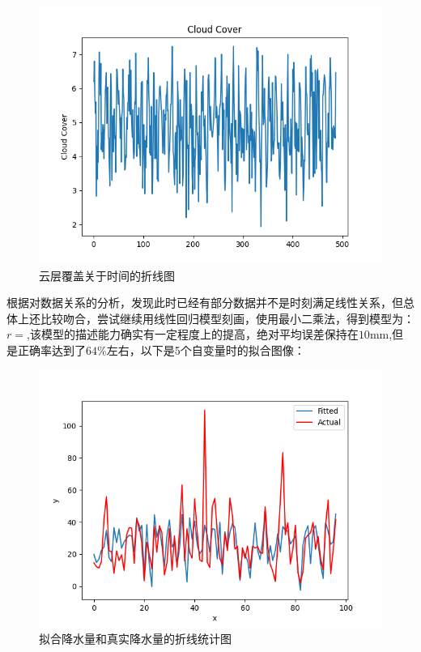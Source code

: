 \documentclass[UTF8, a4paper]{ctexart}
\begin{document}
\clearpage

\begin{figure}[h!]
	\centering
	\includegraphics[scale=0.5]{cc.png}
	\caption{云层覆盖关于时间的折线图}
\end{figure}

根据对数据关系的分析，发现此时已经有部分数据并不是时刻满足线性关系，但总体上还比较吻合，尝试继续用线性回归模型刻画，使用最小二乘法，得到模型为：$r=$,该模型的描述能力确实有一定程度上的提高，绝对平均误差保持在$10$mm,但是正确率达到了$64\%$左右，以下是5个自变量时的拟合图像：

\begin{figure}[h!]
	\centering
	\includegraphics[scale=0.5]{fit2.png}
	\caption{拟合降水量和真实降水量的折线统计图}
\end{figure}
\end{document}
